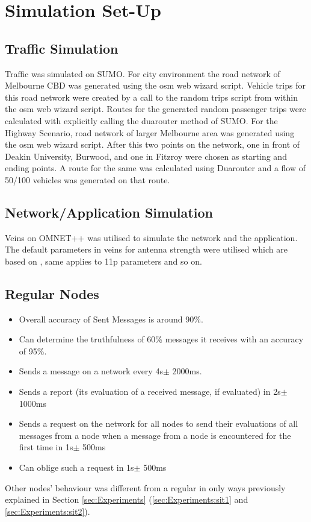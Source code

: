 \documentclass[journal]{IEEEtran}
\begin{document}
\appendices
\setcounter{figure}{0}
\renewcommand\thefigure{\Alph{section}.\arabic{figure}}
\section{Simulation Set-Up}
\label{apdx:simSetUp}
\subsection{Traffic Simulation}
Traffic was simulated on SUMO. For city environment the road network of Melbourne CBD was generated using the osm web wizard script. Vehicle trips for this road network were created by a call to the random trips script from within the osm web wizard script. Routes for the generated random passenger trips were calculated with explicitly calling the duarouter method of SUMO. For the Highway Scenario, road network of larger Melbourne area was generated using the osm web wizard script. After this two points on the network, one in front of Deakin University, Burwood, and one in Fitzroy were chosen as starting and ending points. A route for the same was calculated using Duarouter and a flow of 50/100 vehicles was generated on that route.
\subsection{Network/Application Simulation}
Veins on OMNET++ was utilised to simulate the network and the application. The default parameters in veins for antenna strength were utilised which are based on \cite{c:AntennaOmnetpp}, same applies to 11p parameters and so on.
\subsection{Regular Nodes }
\begin{itemize}
	\item Overall accuracy of Sent Messages is around 90\%.
	\item Can determine the truthfulness of 60\% messages it receives with an accuracy of 95\%.
	\item Sends a message on a network every 4s$ \pm $ 2000ms.
	\item Sends a report (its evaluation of a received message, if evaluated) in 2s$ \pm $ 1000ms
	\item Sends a request on the network for all nodes to send their evaluations of all messages from a node when a message from a node is encountered for the first time in 1s$ \pm $ 500ms
	\item Can oblige such a request in 1s$ \pm $ 500ms
\end{itemize}
Other nodes' behaviour was different from a regular in only ways previously explained in Section \ref{sec:Experiments} (\ref{sec:Experiments:sit1} and \ref{sec:Experiments:sit2}).
\end{document}
